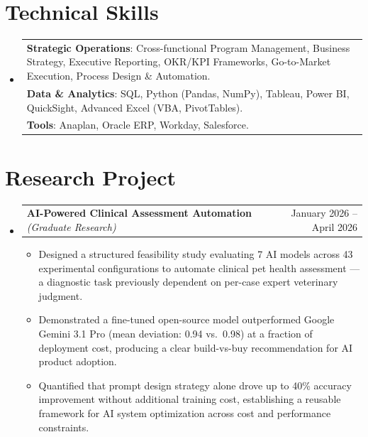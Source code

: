 \documentclass[letterpaper,10pt]{article}
\makeatletter
\newcommand{\resumeItem}[1]{\item\small{{#1\vspace{-2pt}}}}
\newcommand{\resumeProjectHeading}[2]{
  \item\begin{tabular*}{0.97\textwidth}{l@{\extracolsep{\fill}}r}
    \small#1 & #2 \\
  \end{tabular*}\vspace{-7pt}}
\newcommand{\resumeSubHeadingListStart}{\begin{itemize}[leftmargin=0.15in,label={}]}
\newcommand{\resumeSubHeadingListEnd}{\end{itemize}\vspace{-6pt}}
\newcommand{\resumeItemListStart}{\begin{itemize}}
\newcommand{\resumeItemListEnd}{\end{itemize}\vspace{-7pt}}
\makeatother
\begin{document}
\section{Technical Skills}
\resumeSubHeadingListStart
  \item\small{\begin{tabular*}{0.97\textwidth}{p{}}
      \textbf{Strategic Operations}: {Cross-functional Program Management, Business Strategy, Executive Reporting, OKR/KPI Frameworks, Go-to-Market Execution, Process Design \& Automation.} \\
      \textbf{Data \& Analytics}: {SQL, Python (Pandas, NumPy), Tableau, Power BI, QuickSight, Advanced Excel (VBA, PivotTables).} \\
      \textbf{Tools}: {Anaplan, Oracle ERP, Workday, Salesforce.} \\
  \end{tabular*}}
\resumeSubHeadingListEnd

\vspace{-6pt}

\section{Research Project}
\resumeSubHeadingListStart
  \resumeProjectHeading{\textbf{AI-Powered Clinical Assessment Automation} \emph{(Graduate Research)}}{January 2026 -- April 2026}
  \resumeItemListStart
    \resumeItem{Designed a structured feasibility study evaluating 7 AI models across 43 experimental configurations to automate clinical pet health assessment --- a diagnostic task previously dependent on per-case expert veterinary judgment.}
    \resumeItem{Demonstrated a fine-tuned open-source model outperformed Google Gemini 3.1 Pro (mean deviation: 0.94 vs.\ 0.98) at a fraction of deployment cost, producing a clear build-vs-buy recommendation for AI product adoption.}
    \resumeItem{Quantified that prompt design strategy alone drove up to 40\% accuracy improvement without additional training cost, establishing a reusable framework for AI system optimization across cost and performance constraints.}
  \resumeItemListEnd
\resumeSubHeadingListEnd
\end{document}
